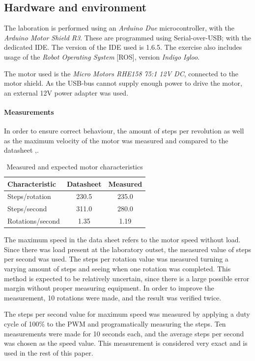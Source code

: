 \documentclass[11pt]{article}
\begin{document}
\subsection{Hardware and environment}
The laboration is performed using an \emph{Arduino Due} microcontroller, with the \emph{Arduino Motor Shield R3}. These are programmed using Serial-over-USB; with the dedicated IDE. The version of the IDE used is 1.6.5. The exercise also includes usage of the \emph{Robot Operating System} [ROS], version \emph{Indigo Igloo}. \par

The motor used is the \emph{Micro Motors RHE158 75:1 12V DC}, connected to the motor shield. As the USB-bus cannot supply enough power to drive the motor, an external 12V power adapter was used.
\paragraph{Measurements}
In order to ensure correct behaviour, the amount of steps per revolution as well as the maximum velocity of the motor was measured and compared to the datasheet \cite{datasheet_motor_1},\cite{datasheet_motor_2}. \par
\begin{table}[!htbp]
  \centering
  \caption{Measured and expected motor characteristics}
  \begin{tabular}{l|cc}
    Characteristic & Datasheet & Measured \\ \hline
    Steps/rotation & 230.5 &235.0\\ 
    Steps/second & 311.0 & 280.0\\
    Rotations/second & 1.35 & 1.19
  \end{tabular}
  \label{tab:measurements}
\end{table}
The maximum speed in the data sheet refers to the motor speed without load. Since there was load present at the laboratory outset, the measured value of steps per second was used. The steps per rotation value was measured turning a varying amount of steps and seeing when one rotation was completed. This method is expected to be relatively uncertain, since there is a large possible error margin without proper measuring equipment. In order to improve the measurement, 10 rotations were made, and the result was verified twice. \par

The steps per second value for maximum speed was measured by applying a duty cycle of 100\% to the PWM and programatically measuring the steps. Ten measurements were made for 10 seconds each, and the average steps per second was chosen as the speed value. This measurement is considered very exact and is used in the rest of this paper. 
\end{document}
